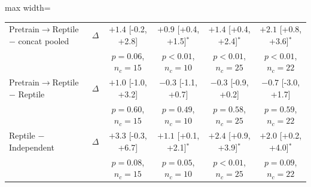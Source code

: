 \begin{table}[ht]
\begin{adjustbox}{max width=\textwidth}
\begin{tabular}{llcccc}
        Pretrain$\rightarrow$Reptile $-$ concat pooled & $\Delta$ & $+1.4$ [-0.2, +2.8] & $+0.9$ [+0.4, +1.5]$^{*}$ & $+1.4$ [+0.4, +2.4]$^{*}$ & $+2.1$ [+0.8, +3.6]$^{*}$ \\
         & & \scriptsize $p=0.06$, $n_c=15$ & \scriptsize $p<0.01$, $n_c=10$ & \scriptsize $p<0.01$, $n_c=25$ & \scriptsize $p<0.01$, $n_c=22$ \\
        Pretrain$\rightarrow$Reptile $-$ Reptile & $\Delta$ & $+1.0$ [-1.0, +3.2] & $-0.3$ [-1.1, +0.7] & $-0.3$ [-0.9, +0.2] & $-0.7$ [-3.0, +1.7] \\
         & & \scriptsize $p=0.60$, $n_c=15$ & \scriptsize $p=0.49$, $n_c=10$ & \scriptsize $p=0.58$, $n_c=25$ & \scriptsize $p=0.59$, $n_c=22$ \\
        Reptile $-$ Independent & $\Delta$ & $+3.3$ [-0.3, +6.7] & $+1.1$ [+0.1, +2.1]$^{*}$ & $+2.4$ [+0.9, +3.9]$^{*}$ & $+2.0$ [+0.2, +4.0]$^{*}$ \\
         & & \scriptsize $p=0.08$, $n_c=15$ & \scriptsize $p=0.05$, $n_c=10$ & \scriptsize $p<0.01$, $n_c=25$ & \scriptsize $p=0.09$, $n_c=22$ \\
        \bottomrule
    \end{tabular}
    \end{adjustbox}
\end{table}
